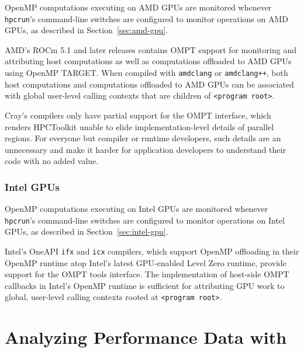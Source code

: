 \documentclass[11pt,twoside,letterpaper]{report}
\begin{document}
OpenMP computations executing on AMD GPUs are monitored whenever {\tt hpcrun}'s command-line switches are configured to monitor operations on AMD GPUs, as described in Section~\ref{sec:amd-gpu}.

AMD's ROCm 5.1 and later releases contains OMPT support for monitoring and attributing host computations as well as computations
offloaded to AMD GPUs using OpenMP TARGET. When compiled with  {\tt amdclang} or {\tt amdclang++}, both host computations and computations offloaded to AMD GPUs can be associated with global user-level calling contexts that are children of \verb|<program root>|.

Cray's compilers only have partial support for the OMPT interface, which renders HPCToolkit unable to elide implementation-level details of parallel regions. For everyone but compiler or runtime developers, such details are an unnecessary and make it harder for application developers to understand their code with no added value.


\subsection{Intel GPUs}

OpenMP computations executing on Intel GPUs are monitored whenever {\tt hpcrun}'s command-line switches are configured to monitor operations on Intel GPUs, as described in Section~\ref{sec:intel-gpu}.

Intel's OneAPI {\tt ifx} and {\tt icx} compilers, which support OpenMP offloading in their OpenMP runtime atop Intel's latest GPU-enabled Level Zero runtime, provide support for the OMPT tools interface.
The implementation of host-side OMPT callbacks in Intel's OpenMP runtime is sufficient for attributing GPU work to global, user-level calling contexts rooted at \verb|<program root>|.




\cleardoublepage
\chapter{Analyzing Performance Data with \hpcviewer{}}
\label{chpt:hpcviewer-interface}




\end{document}
